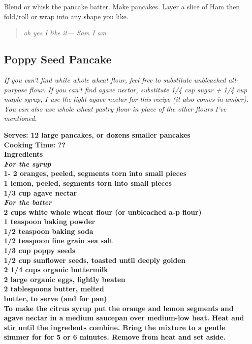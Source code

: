 \documentclass[18pt, oneside]{book}
\begin{document}
Blend or whisk the pancake batter. Make pancakes. Layer a slice of Ham then fold/roll or wrap into any shape you like.

\begin{quote}
\it{oh yes I like it--- Sam I am} \normalfont
\end{quote}

\subsection{Poppy Seed Pancake}

\textit{If you can't find white whole wheat flour, feel free to substitute unbleached all-purpose flour. If you can't find agave nectar, substitute 1/4 cup sugar + 1/4 cup maple syrup, I use the light agave nectar for this recipe (it also comes in amber). You can also use whole wheat pastry flour in place of the other flours I've mentioned. \\ }

\bf{Serves: 12 large pancakes, or dozens smaller pancakes} \\
\bf{Cooking Time: ??} \\

\bf{Ingredients} \normalfont \\ 
\textit{For the syrup} \\
1- 2 oranges, peeled, segments torn into small pieces \\
1 lemon, peeled, segments torn into small pieces \\
1/3 cup agave nectar \\

\textit{For the batter} \\
2 cups white whole wheat flour (or unbleached a-p flour) \\
1 teaspoon baking powder \\
1/2 teaspoon baking soda \\
1/2 teaspoon fine grain sea salt \\
1/3 cup poppy seeds \\
1/2 cup sunflower seeds, toasted until deeply golden \\
2 1/4 cups organic buttermilk \\
2 large organic eggs, lightly beaten \\
2 tablespoons butter, melted \\ 
butter, to serve (and for pan) \\

To make the citrus syrup put the orange and lemon segments and agave nectar in a medium saucepan over medium-low heat. Heat and stir until the ingredents combine. Bring the mixture to a gentle simmer for for 5 or 6 minutes. Remove from heat and set aside. \\
\end{document}

